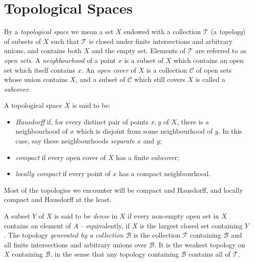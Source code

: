 \documentclass[11pt,a4paper]{report}
\theoremstyle{plain}
\theoremstyle{definition}
\newcommand{\1}{\mathbbm{1}}
\newcommand{\B}{\mathcal{B}}
\newcommand{\T}{\mathcal{T}}
\newcommand{\cover}{\mathcal{C}}
\begin{document}
\section{Topological Spaces}
By a \emph{topological space} we mean a set $X$ endowed with a collection $\T$ 
(a \emph{topology}) of subsets of $X$ such that $\T$ is closed under finite 
intersections and arbitrary unions, and contains both $X$ and the empty set. 
Elements of $\T$ are referred to as \emph{open sets}.
A \emph{neighbourhood} of a point $x$ is a subset of $X$ which contains an open 
set which itself contains $x$. An \emph{open cover} of $X$ is a collection 
$\cover$ of open sets whose union contains $X$, and a subset of $\cover$ which 
still covers $X$ is called a \emph{subcover}. 

A topological space $X$ is said to be:
\begin{itemize}
	\item \emph{Hausdorff} if, for every distinct pair of points $x,y$ of $X$, 
	there is a neighbourhood of $x$ which is disjoint from some neighbourhood of 
	$y$. In this case, say these neighbourhoods \emph{separate} $x$ and $y$;
	\item \emph{compact} if every open cover of $X$ has a finite subcover;
	\item \emph{locally compact} if every point of $x$ has a compact neighbourhood.
\end{itemize}
Most of the topologies we encounter will be compact and Hausdorff, and locally compact 
and Hausdorff at the least.

A subset $Y$ of $X$ is said to be \emph{dense} in $X$ if every non-empty open set 
in $X$ contains an element of $A$ -- equivalently, if $X$ is the largest closed 
set containing $Y$. The topology \emph{generated by a collection $\B$} is the 
collection $\T$ containing $\B$ and all finite intersections and arbitrary 
unions over $\B$. It is the weakest topology on $X$ containing $\B$, in the 
sense that any topology containing $\B$ contains all of $\T$.
\end{document}
